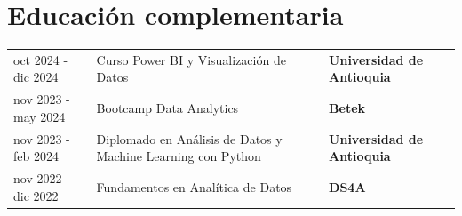 \documentclass[a4paper, 10pt]{article}
\begin{document}
\section{Educación complementaria}
\begin{tabularx}{\linewidth}{@{}l X@{} l@{}}

oct 2024 - dic 2024 & Curso Power BI y Visualización de Datos & 
\textbf{Universidad de Antioquia} \hfill \normalsize \\

nov 2023 - may 2024 & Bootcamp Data Analytics & \textbf{Betek} \hfill \normalsize \\

nov 2023 - feb 2024 & Diplomado en Análisis de Datos y Machine Learning con Python & \textbf{Universidad de Antioquia} \hfill \normalsize \\

nov 2022 - dic 2022 & Fundamentos en Analítica de Datos  & \textbf{DS4A} \hfill \normalsize \\
\end{tabularx}

\end{document}

